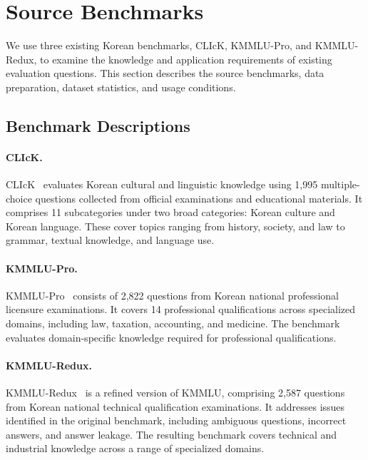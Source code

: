 \newpage

\section{Source Benchmarks}
\label{app:source_benchmarks}

We use three existing Korean benchmarks, CLIcK, KMMLU-Pro, and KMMLU-Redux, to examine the knowledge and application requirements of existing evaluation questions.
This section describes the source benchmarks, data preparation, dataset statistics, and usage conditions.

\subsection{Benchmark Descriptions}

\paragraph{CLIcK.}
CLIcK~\citep{kim2024click} evaluates Korean cultural and linguistic knowledge using 1,995 multiple-choice questions collected from official examinations and educational materials.
It comprises 11 subcategories under two broad categories: Korean culture and Korean language.
These cover topics ranging from history, society, and law to grammar, textual knowledge, and language use.

\paragraph{KMMLU-Pro.}
KMMLU-Pro~\citep{hong-etal-2025-kmmlu} consists of 2,822 questions from Korean national professional licensure examinations.
It covers 14 professional qualifications across specialized domains, including law, taxation, accounting, and medicine.
The benchmark evaluates domain-specific knowledge required for professional qualifications.

\paragraph{KMMLU-Redux.}
KMMLU-Redux~\citep{hong-etal-2025-kmmlu} is a refined version of KMMLU, comprising 2,587 questions from Korean national technical qualification examinations.
It addresses issues identified in the original benchmark, including ambiguous questions, incorrect answers, and answer leakage.
The resulting benchmark covers technical and industrial knowledge across a range of specialized domains.

